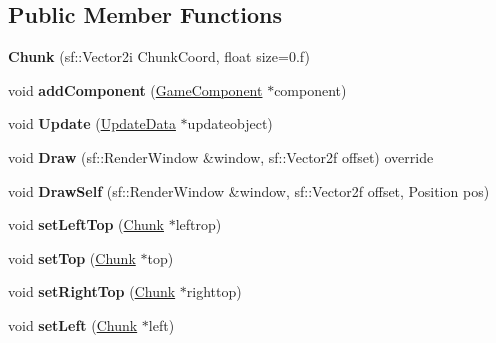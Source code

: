 \subsection*{Public Member Functions}
\begin{DoxyCompactItemize}
\item 
\hypertarget{class_chunk_ad46cf5f6f874fbeff528ef237251a9f2}{{\bfseries Chunk} (sf\-::\-Vector2i Chunk\-Coord, float size=0.f)}\label{class_chunk_ad46cf5f6f874fbeff528ef237251a9f2}

\item 
\hypertarget{class_chunk_aa5b5c5515c800f2171899caf704db5dc}{void {\bfseries add\-Component} (\hyperlink{class_game_component}{Game\-Component} $\ast$component)}\label{class_chunk_aa5b5c5515c800f2171899caf704db5dc}

\item 
\hypertarget{class_chunk_a750907d92efc9e45bfff5e280fa55afe}{void {\bfseries Update} (\hyperlink{class_update_data}{Update\-Data} $\ast$updateobject)}\label{class_chunk_a750907d92efc9e45bfff5e280fa55afe}

\item 
\hypertarget{class_chunk_a3203da1471b5572e0dd2cd82e6dceb42}{void {\bfseries Draw} (sf\-::\-Render\-Window \&window, sf\-::\-Vector2f offset) override}\label{class_chunk_a3203da1471b5572e0dd2cd82e6dceb42}

\item 
\hypertarget{class_chunk_a238c9e4adf0dfc78d6b8c778aec66e69}{void {\bfseries Draw\-Self} (sf\-::\-Render\-Window \&window, sf\-::\-Vector2f offset, Position pos)}\label{class_chunk_a238c9e4adf0dfc78d6b8c778aec66e69}

\item 
\hypertarget{class_chunk_ac747f2b3da1e583e3b64ca328bf04d77}{void {\bfseries set\-Left\-Top} (\hyperlink{class_chunk}{Chunk} $\ast$leftrop)}\label{class_chunk_ac747f2b3da1e583e3b64ca328bf04d77}

\item 
\hypertarget{class_chunk_a6cc69f33389b5510766f23317ff7ae65}{void {\bfseries set\-Top} (\hyperlink{class_chunk}{Chunk} $\ast$top)}\label{class_chunk_a6cc69f33389b5510766f23317ff7ae65}

\item 
\hypertarget{class_chunk_a8c19057f7360349f5d214bfa50d51900}{void {\bfseries set\-Right\-Top} (\hyperlink{class_chunk}{Chunk} $\ast$righttop)}\label{class_chunk_a8c19057f7360349f5d214bfa50d51900}

\item 
\hypertarget{class_chunk_aa0005654a92c0ca50f90c516d508834c}{void {\bfseries set\-Left} (\hyperlink{class_chunk}{Chunk} $\ast$left)}\label{class_chunk_aa0005654a92c0ca50f90c516d508834c}


\end{DoxyCompactItemize}
